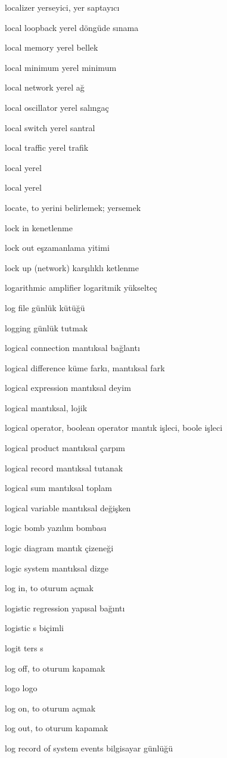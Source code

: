 \documentclass[12pt,fleqn]{article}\usepackage{../../common}
\begin{document}
localizer yerseyici, yer saptayıcı

local loopback yerel döngüde sınama

local memory yerel bellek

local minimum yerel minimum

local network yerel ağ

local oscillator yerel salıngaç

local switch yerel santral

local traffic yerel trafik

local yerel

local yerel

locate, to yerini belirlemek; yersemek

lock in kenetlenme

lock out eşzamanlama yitimi

lock up (network) karşılıklı ketlenme

logarithmic amplifier logaritmik yükselteç

log file günlük kütüğü

logging günlük tutmak

logical connection mantıksal bağlantı

logical difference küme farkı, mantıksal fark

logical expression mantıksal deyim

logical mantıksal, lojik

logical operator, boolean operator mantık işleci, boole işleci

logical product mantıksal çarpım

logical record mantıksal tutanak

logical sum mantıksal toplam

logical variable mantıksal değişken

logic bomb yazılım bombası

logic diagram mantık çizeneği

logic system mantıksal dizge

log in, to oturum açmak

logistic regression yapısal bağıntı

logistic s biçimli

logit ters s

log off, to oturum kapamak

logo logo

log on, to oturum açmak

log out, to oturum kapamak

log record of system events bilgisayar günlüğü
\end{document}
